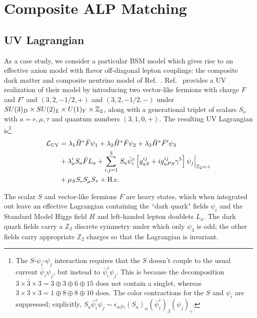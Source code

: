 \chapter{Composite ALP Matching}\label{ALP_match}

\section{UV Lagrangian \label{sec:model}}

As a case study, we consider a particular BSM model which gives rise to an effective axion model with flavor off-diagonal lepton couplings: the composite dark matter and composite neutrino model of Ref.~\cite{Davoudiasl:2017zws}. Ref.~\cite{Davoudiasl:2017zws} provides a UV realization of their model by introducing two vector-like fermions with charge $F$ and $F'$ and $(3, 2, -1/2, +)$ and $(3, 2, -1/2, -)$ under $SU(3)_D \times SU(2)_L\times U(1)_Y \times {\Bbb Z}_2$, along with a generational triplet of scalars $S_a$ with $a = e,\mu,\tau$ and quantum numbers $(3, 1, 0, +)$. The resulting UV Lagrangian is\footnote{The $S$-$\psi_i$-$\psi_j$ interaction requires that the $S$ doesn't couple to the usual current $\bar{\psi}_i\psi_j$, but instead to $\bar{\psi}_i^c \psi_j$. This is because the decomposition $3\times\bar{3}\times 3 = 3\oplus 3\oplus 6\oplus 15$ does not contain a singlet, whereas $3\times 3 \times 3 = 1 \oplus 8 \oplus 8 \oplus 10$ does. The color contractions for the $S$ and $\psi_i$ are suppressed; explicitly, $S_a \bar{\psi}_i^c \psi_j \sim \epsilon_{\alpha\beta\gamma}(S_a)_\alpha (\bar{\psi}^c_i)_\beta (\psi_j)_\gamma$. 
}
\begin{align}
    {\cal L}_{\rm UV} &= \lambda_1 \tilde{H}^*\bar{F}\psi_1 + \lambda_2\tilde{H}^*\bar{F}\psi_2 + \lambda_3 \tilde{H}^*\bar{F}'\psi_3 \nonumber \\
    &+ \lambda_a' S_a \bar{F}L_a + \sum_{i,j=1}^{3}\left.S_a\bar{\psi}_i^c\left[g_{aS}^{ij}+ig_{aPS}^{ij}\gamma^5\right]\psi_j\right|_{{\Bbb Z}_2 = +} \nonumber \\
    &+ \mu_S S_e S_\mu S_\tau + {\rm H.c.}\label{eq:UV_lag} 
\end{align}


The scalar $S$ and vector-like fermions $F$ are heavy states, which when integrated out leave an effective Lagrangian containing the ``dark quark" fields $\psi_i$ and the Standard Model Higgs field $H$ and left-handed lepton doublets $L_a$.  The dark quark fields carry a $\mathbb{Z}_2$ discrete symmetry under which only $\psi_3$ is odd; the other fields carry appropriate $\mathbb{Z}_2$ charges so that the Lagrangian is invariant. 

